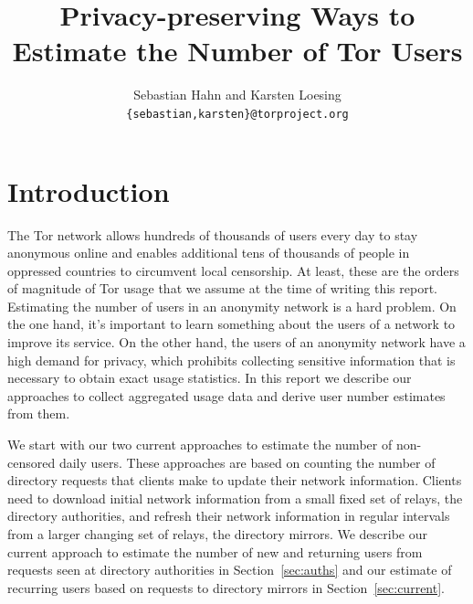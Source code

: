 \documentclass{article}
\begin{document}
\author{Sebastian Hahn and Karsten Loesing\\{\tt\{sebastian,karsten\}@torproject.org}}
\title{Privacy-preserving Ways to\\Estimate the Number of Tor Users}
\maketitle

\section{Introduction}

The Tor network allows hundreds of thousands of users every day to stay
anonymous online and enables additional tens of thousands of people in
oppressed countries to circumvent local censorship.
At least, these are the orders of magnitude of Tor usage that we assume
at the time of writing this report.
Estimating the number of users in an anonymity network is a hard
problem.
On the one hand, it's important to learn something about the users of a
network to improve its service.
On the other hand, the users of an anonymity network have a high
demand for privacy, which prohibits collecting sensitive information that
is necessary to obtain exact usage statistics.
In this report we describe our approaches to collect aggregated usage
data and derive user number estimates from them.

We start with our two current approaches to estimate the number of
non-censored daily users.
These approaches are based on counting the number of directory
requests that clients make to update their network information.
Clients need to download initial network information from a small fixed
set of relays, the directory authorities, and refresh their network
information in regular intervals from a larger changing set of relays, the
directory mirrors.
We describe our current approach to estimate the number of new and
returning users from requests seen at directory authorities in
Section~\ref{sec:auths} and our estimate of recurring users based on
requests to directory mirrors in Section~\ref{sec:current}.
\end{document}
